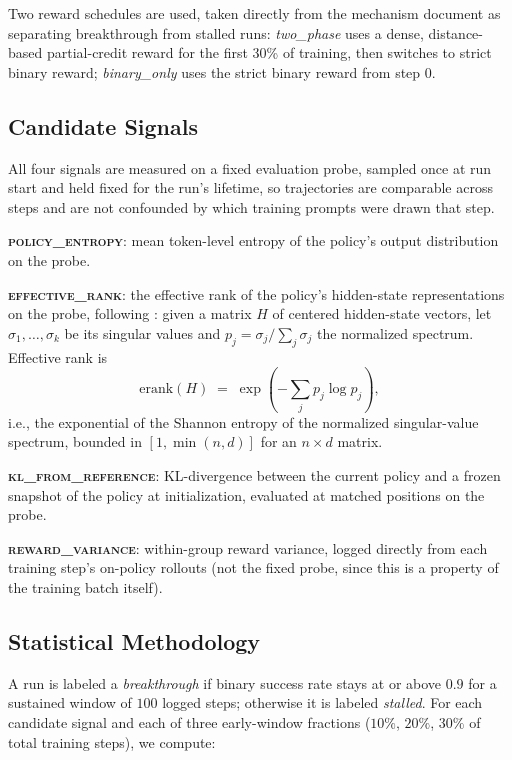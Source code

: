 \documentclass{article}
\newcommand{\erank}{\textsc{effective\_rank}}
\newcommand{\pentropy}{\textsc{policy\_entropy}}
\newcommand{\klref}{\textsc{kl\_from\_reference}}
\newcommand{\rvar}{\textsc{reward\_variance}}
\begin{document}
Two reward schedules are used, taken directly from the mechanism
\citet{sun2026rlgrokking} document as separating breakthrough from stalled
runs: \emph{two\_phase} uses a dense, distance-based partial-credit reward for
the first 30\% of training, then switches to strict binary reward;
\emph{binary\_only} uses the strict binary reward from step 0.

\subsection{Candidate Signals}
\label{sec:signals}

All four signals are measured on a fixed evaluation probe, sampled once at run
start and held fixed for the run's lifetime, so trajectories are comparable
across steps and are not confounded by which training prompts were drawn that
step.

\textbf{\pentropy}: mean token-level entropy of the policy's output
distribution on the probe.

\textbf{\erank}: the effective rank of the policy's hidden-state
representations on the probe, following \citet{roy2007effective}: given a
matrix $H$ of centered hidden-state vectors, let $\sigma_1,\dots,\sigma_k$ be
its singular values and $p_j = \sigma_j / \sum_j \sigma_j$ the normalized
spectrum. Effective rank is
\begin{equation}
\mathrm{erank}(H) \;=\; \exp\!\left(-\sum_j p_j \log p_j\right),
\label{eq:erank}
\end{equation}
i.e., the exponential of the Shannon entropy of the normalized singular-value
spectrum, bounded in $[1, \min(n,d)]$ for an $n \times d$ matrix.

\textbf{\klref}: KL-divergence between the current policy and a frozen
snapshot of the policy at initialization, evaluated at matched positions on
the probe.

\textbf{\rvar}: within-group reward variance, logged directly from each
training step's on-policy rollouts (not the fixed probe, since this is a
property of the training batch itself).

\subsection{Statistical Methodology}
\label{sec:stats}

A run is labeled a \emph{breakthrough} if binary success rate stays at or above
$0.9$ for a sustained window of $100$ logged steps; otherwise it is labeled
\emph{stalled}. For each candidate signal and each of three early-window
fractions ($10\%$, $20\%$, $30\%$ of total training steps), we compute:
\end{document}
